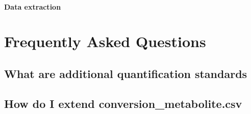 \documentclass[]{book}
\theoremstyle{definition}
\theoremstyle{definition}
\theoremstyle{definition}
\theoremstyle{remark}
\begin{document}
\subsubsection{Data extraction}\label{data-extraction}

\chapter{Frequently Asked Questions}\label{FAQ}

\section{What are additional quantification
standards}\label{what-are-additional-quantification-standards}

\section{How do I extend
conversion\_metabolite.csv}\label{how-do-i-extend-conversion_metabolite.csv}


\end{document}
